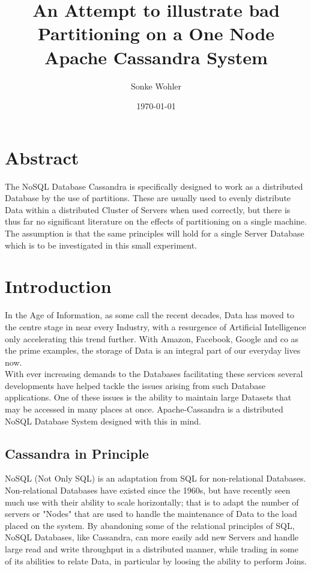 \documentclass{template/csfourzero}
\title{An Attempt to illustrate bad Partitioning on a One Node Apache Cassandra System}
\author{Sonke Wohler}
\date{\today}
\begin{document}
\maketitle

\section{Abstract} %

The NoSQL Database Cassandra is specifically designed to work as a distributed Database by the use of partitions. These are usually used to evenly distribute Data within a distributed Cluster of Servers when used correctly, but there is thus far no significant literature on the effects of partitioning on a single machine. The assumption is that the same principles will hold for a single Server Database which is to be investigated in this small experiment.


\section{Introduction} %
\label{sec:intro}

  In the Age of Information, as some call the recent decades, Data has moved to the centre stage in near every Industry, with a resurgence of Artificial Intelligence only accelerating this trend further. With Amazon, Facebook, Google and co as the prime examples, the storage of Data is an integral part of our everyday lives now. \cite{riseNoSQL}
  \\
  With ever increasing demands to the Databases facilitating these services several developments have helped tackle the issues arising from such Database applications. One of these issues is the ability to maintain large Datasets that may be accessed in many places at once. Apache-Cassandra is a distributed NoSQL Database System designed with this in mind.\cite{apacheCassandra,nonsenSQL,amazonFuture}
  \subsection{Cassandra in Principle}
  NoSQL (Not Only SQL) is an adaptation from SQL for non-relational Databases. Non-relational Databases have existed since the 1960s, but have recently seen much use with their ability to scale horizontally; that is to adapt the number of servers or "Nodes" that are used to handle the maintenance of Data to the load placed on the system. By abandoning some of the relational principles of SQL, NoSQL Databases, like Cassandra, can more easily add new Servers and handle large read and write throughput in a distributed manner, while trading in some of its abilities to relate Data, in particular by loosing the ability to perform Joins.\cite{apacheCassandra,nonsenSQL,amazonFuture,cassandraBasics}
\end{document}
